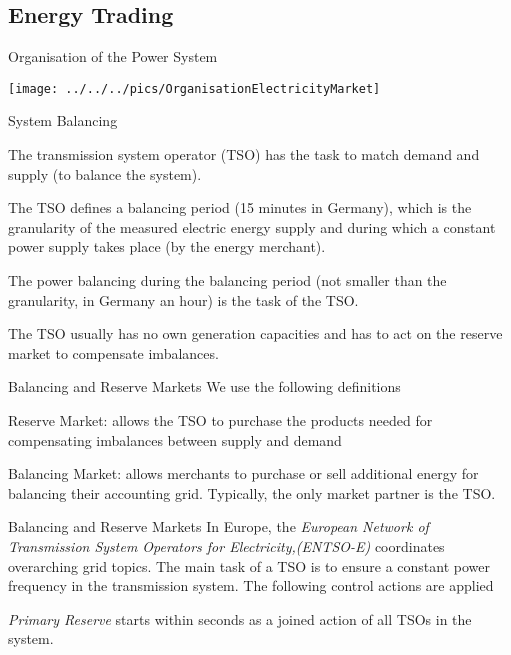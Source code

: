 
\subsection{Energy Trading}

{Organisation of the Power System}
\begin{center}
\texttt{[image: ../../../pics/OrganisationElectricityMarket]}
\end{center}

{System Balancing}


	The transmission system operator (TSO) has the task to match demand and supply (to balance the system).

	The TSO defines a balancing period (15 minutes in Germany), which is the granularity of the measured electric energy supply and during which a constant power supply takes place (by the energy merchant).

	The power balancing during the balancing period (not smaller than the granularity, in Germany an hour) is the task of the TSO.

	The TSO usually has no own generation capacities and has to act on the reserve market to compensate imbalances.


{Balancing and Reserve Markets}
We use the following definitions


	Reserve Market: allows the TSO to purchase the products needed for compensating imbalances between supply and demand

	Balancing Market: allows merchants to purchase or sell additional energy for balancing their accounting grid. Typically, the only market partner is the TSO.


{Balancing and Reserve Markets}
In Europe, the {\it European Network of Transmission System Operators for Electricity,(ENTSO-E)} coordinates overarching grid topics. The main task of a TSO is to ensure a constant power frequency in the transmission system. The following control actions are applied


	{\it Primary Reserve}   starts within seconds as a joined action of all TSOs in the system.

